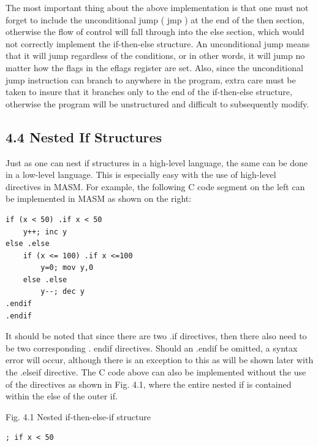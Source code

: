 \documentclass[10pt]{article}
\begin{document}
The most important thing about the above implementation is that one must not forget to include the unconditional jump ( jmp ) at the end of the then section, otherwise the flow of control will fall through into the else section, which would not correctly implement the if-then-else structure. An unconditional jump means that it will jump regardless of the conditions, or in other words, it will jump no matter how the flags in the eflags register are set. Also, since the unconditional jump instruction can branch to anywhere in the program, extra care must be taken to insure that it branches only to the end of the if-then-else structure, otherwise the program will be unstructured and difficult to subsequently modify.

\subsection*{4.4 Nested If Structures}
Just as one can nest if structures in a high-level language, the same can be done in a low-level language. This is especially easy with the use of high-level directives in MASM. For example, the following C code segment on the left can be implemented in MASM as shown on the right:

\begin{verbatim}
if (x < 50) .if x < 50
    y++; inc y
else .else
    if (x <= 100) .if x <=100
        y=0; mov y,0
    else .else
        y--; dec y
.endif
.endif
\end{verbatim}

It should be noted that since there are two .if directives, then there also need to be two corresponding . endif directives. Should an .endif be omitted, a syntax error will occur, although there is an exception to this as will be shown later with the .elseif directive. The C code above can also be implemented without the use of the directives as shown in Fig. 4.1, where the entire nested if is contained within the else of the outer if.

Fig. 4.1 Nested if-then-else-if structure

\begin{verbatim}
; if x < 50
\end{verbatim}
\end{document}
